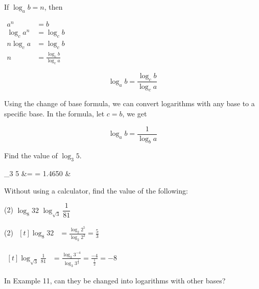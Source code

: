 \documentclass{report}
\begin{document}
If $\log_a b = n$, then
        
$\begin{aligned} a^n & =b \\ \log _c a^n & =\log _c b \\ n \log _c a & =\log _c b \\ n & =\frac{\log _c b}{\log _c a}\end{aligned}$

\begin{info}
	$$\log _a b=\frac{\log _c b}{\log _c a}$$
\end{info}

Using the change of base formula, we can convert logarithms with any base to a specific base. In the formula, let $c = b$, we get
\begin{info}
	$$\log _a b=\frac{1}{\log _b a}$$
\end{info}

\begin{question}
	Find the value of $\log_3 5$.
	
	\sol{}
	\begin{flalign*}
		\log_3 5 &=  = 1.4650 &
	\end{flalign*}
\end{question}

\begin{question}
	Without using a calculator, find the value of the following:
	\begin{tasks}[label=(\alph*)](2)
		\task $\log_8 32$
		\task $\log_{\sqrt{3}} \dfrac{1}{81}$
	\end{tasks}
	
	\sol{}
	\begin{tasks}[label=(\alph*)](2)
		\task $\begin{aligned}[t]
		\log _8 32 &=\frac{\log _2 2^5}{\log _2 2^3} =\frac{5}{3}
		\end{aligned}$
		
		\task $
		\begin{aligned}[t]
			\log _{\sqrt{3}} \frac{1}{81} & =\frac{\log _3 3^{-4}}{\log _3 3^{\frac{1}{2}}} =\frac{-4}{\frac{1}{2}} =-8 
		\end{aligned}
		$
		                
	\end{tasks}
\end{question}

\begin{think}
	            
	In Example 11, can they be changed into logarithms with other bases?
\end{think}
\end{document}
